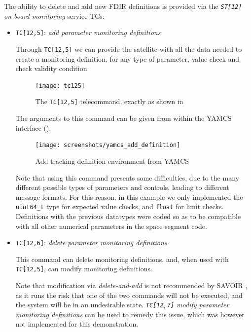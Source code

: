 \documentclass[a4paper,nobib]{tufte-book}
\begin{document}
	The ability to delete and add new \acs{FDIR} definitions is provided via the \emph{\texttt{ST[12]} on-board monitoring} service \acsp{TC}:
	
	\begin{itemize}
	\item \texttt{TC[12,5]}: \emph{add parameter monitoring definitions}
	
	Through \texttt{TC[12,5]} we can provide the satellite with all the data needed to create a monitoring definition, for any type of parameter, value check and check validity condition.
	
	\begin{figure}[h]
		\texttt{[image: tc125]}
		\caption{The \texttt{TC[12,5]} telecommand, exactly as shown in \autocite{ECSS-E-ST-70-41C}}
	\end{figure}
	
	The arguments to this command can be given from within the \acs{YAMCS} interface ().
	
	\begin{figure}[h]
		\centering
		\texttt{[image: screenshots/yamcs\_add\_definition]}
		\caption{Add tracking definition environment from \acs{YAMCS}}
		\label{fig:yamcs_add_definition}
	\end{figure}
	
	Note that using this command presents some difficulties, due to the many different possible types of parameters and controls, leading to different message formats. For this reason, in this example we only implemented the \texttt{uint64_t} type for expected value checks, and \texttt{float} for limit checks. Definitions with the previous datatypes were coded so as to be compatible with all other numerical parameters in the space segment code.
		
	\item \texttt{TC[12,6]}: \emph{delete parameter monitoring definitions}
		
		This command can delete monitoring definitions, and, when used with \texttt{TC[12,5]}, can modify monitoring definitions.
		
		Note that modification via \emph{delete-and-add} is not recommended by \acs{SAVOIR} \autocite{SAVOIR-HB-003}, as it runs the risk that one of the two commands will not be executed, and the system will be in an undesirable state. \emph{\texttt{TC[12,7]} modify parameter monitoring definitions} can be used to remedy this issue, which was however not implemented for this demonstration.
		
	\end{itemize}
	
\end{document}
